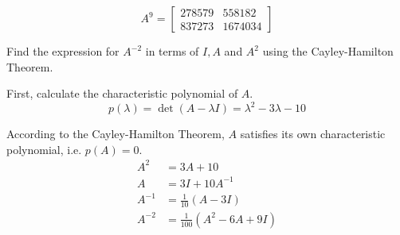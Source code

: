 \documentclass[a4paper,11pt]{exam}
\begin{document}
\begin{questions}
\begin{parts}
\begin{subparts}
\begin{solution}
                \[
                    A^9 = \left[\begin{array}{cc}278579 & 558182\\837273 & 1674034\end{array}\right]
                \]
            \end{solution}

            \subpart Find the expression for $A^{-2}$ in terms of $I, A$ and $A^2$ using the Cayley-Hamilton Theorem.

            \begin{solution}
                First, calculate the characteristic polynomial of $A$.
                \[ p(\lambda) = \operatorname{det} \left(A - \lambda I\right) = \lambda^2 -3 \lambda -10 \]

                According to the Cayley-Hamilton Theorem, $A$ satisfies its own characteristic polynomial, i.e. $p(A) = 0$.
                \begin{align*}
                    A^2    & = 3A + 10                          \\
                    A      & = 3I + 10A^{-1}                    \\
                    A^{-1} & = \frac{1}{10} \left(A - 3I\right) \\
                    A^{-2} & = \frac{1}{100} \left( A^2 - 6A + 9I \right)
                \end{align*}


            \end{solution}
        \end{subparts}


\end{parts}
\end{questions}
\end{document}
